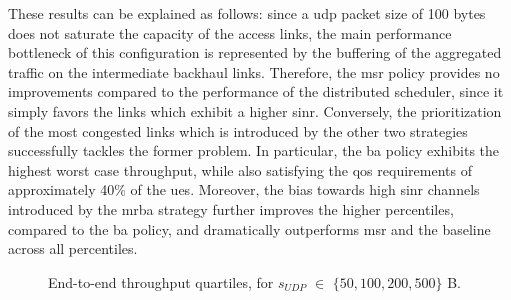 These results can be explained as follows: since a \gls{udp} packet size of 100 bytes does not saturate the capacity of the access links, the main performance bottleneck of this configuration is represented by the buffering of the aggregated traffic on the intermediate backhaul links. Therefore, the \gls{msr} policy provides no improvements compared to the performance of the distributed scheduler, since it simply favors the links which exhibit a higher \gls{sinr}. Conversely, the prioritization of the most congested links which is introduced by the other two strategies successfully tackles the former problem. 
In particular, the \gls{ba} policy exhibits the highest worst case throughput, while also satisfying the \gls{qos} requirements of approximately 40\% of the \glspl{ue}. Moreover, the bias towards high \gls{sinr} channels introduced by the \gls{mrba} strategy further improves the higher percentiles, compared to the \gls{ba} policy, and dramatically outperforms \gls{msr} and the baseline across all percentiles. 
\begin{figure}[t!]
  \centering
  \hfill
{}
   \caption{End-to-end throughput quartiles, for $s_{UDP}$ $\in$ $\{50, 100, 200, 500 \}$ B.}
  \label{Fig:Throughput_quartiles}
  \vspace{-0.1cm} 
\end{figure}

